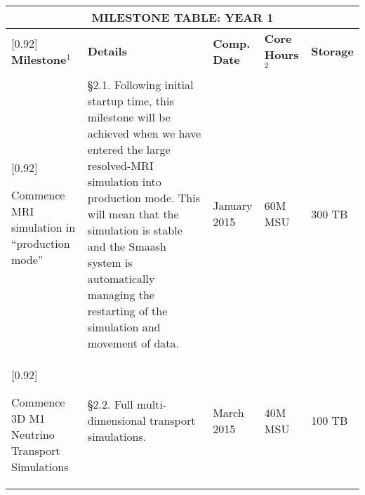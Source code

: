 \documentclass[11pt]{article}
\begin{document}
\begin{table}[t]
\begin{tabular}{|p{2.00in}|p{4.1in}|p{1.00in}|p{0.95in}|p{0.65in}|}
\multicolumn{5}{c}{\textbf{MILESTONE TABLE: YEAR 1}}\\
\hline\hline
\rowcolor{Gold1}[0.92\tabcolsep]
\textbf{Milestone$^1$}&\textbf{Details}&
\textbf{Comp. Date}&\textbf{Core Hours$^2$}&
\textbf{Storage}\\
\hline\hline
\rowcolor{Aquamarine1}[0.92\tabcolsep]
\raggedright
Commence MRI simulation in ``production mode''&
%
\S 2.1.  Following initial startup time, this milestone will be
achieved when we have entered the large resolved-MRI simulation into
production mode.  This will mean that the simulation is stable and the
Smaash system is automatically managing the restarting of the
simulation and movement of data.&
%
\raggedright
January 2015  &
%
60M MSU &
%
300 TB \\
\hline
\rowcolor{Aquamarine1}[0.92\tabcolsep]
\raggedright
Commence 3D M1 Neutrino Transport Simulations&
%
\S2.2.  Full multi-dimensional transport simulations. &
%
\raggedright
March 2015&
%
40M MSU &
%
100 TB
 \\
\hline

\end{tabular}
\end{table}
\end{document}
